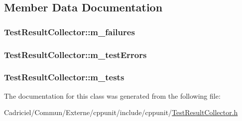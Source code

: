 \subsection{Member Data Documentation}
\hypertarget{class_test_result_collector_ae2958ff17d1fd73092bf8ec4fc5db08f}{
\subsubsection[{m\-\_\-failures}]{ Test\-Result\-Collector\-::m\-\_\-failures\hspace{0.3cm}{\ttfamily [protected]}}}\label{class_test_result_collector_ae2958ff17d1fd73092bf8ec4fc5db08f}
\hypertarget{class_test_result_collector_a42fdacb6076281e8abb6eba08063fb4e}{
\subsubsection[{m\-\_\-test\-Errors}]{ Test\-Result\-Collector\-::m\-\_\-test\-Errors\hspace{0.3cm}{\ttfamily [protected]}}}\label{class_test_result_collector_a42fdacb6076281e8abb6eba08063fb4e}
\hypertarget{class_test_result_collector_a63950609cce95633b56850da67d4bfe0}{
\subsubsection[{m\-\_\-tests}]{ Test\-Result\-Collector\-::m\-\_\-tests\hspace{0.3cm}{\ttfamily [protected]}}}\label{class_test_result_collector_a63950609cce95633b56850da67d4bfe0}


The documentation for this class was generated from the following file\-:\begin{DoxyCompactItemize}
\item 
Cadriciel/\-Commun/\-Externe/cppunit/include/cppunit/\hyperlink{_test_result_collector_8h}{Test\-Result\-Collector.\-h}\end{DoxyCompactItemize}
